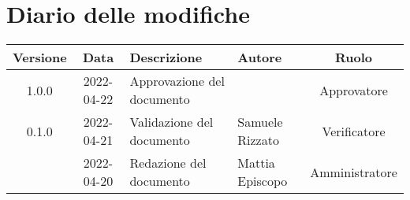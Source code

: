 \section*{Diario delle modifiche}
	\begin{center}
	\renewcommand{\arraystretch}{1.8}
	\begin{tabular}{ |c|c|m{12em}|m{7em}|c| }
	\hline
	\textbf{Versione} & \textbf{Data} & \textbf{Descrizione} &  \textbf{Autore} &  \textbf{Ruolo} \\
	\hline
	1.0.0 & 2022-04-22 & Approvazione del documento & \docApprovazione & Approvatore\\
	\hline
	0.1.0 & 2022-04-21 & Validazione del documento & Samuele \newline Rizzato & Verificatore\\
	\hline
    & 2022-04-20 & Redazione del documento & Mattia \newline Episcopo & Amministratore\\ 
	\hline
	\end{tabular}
	\end{center}
	\newpage
